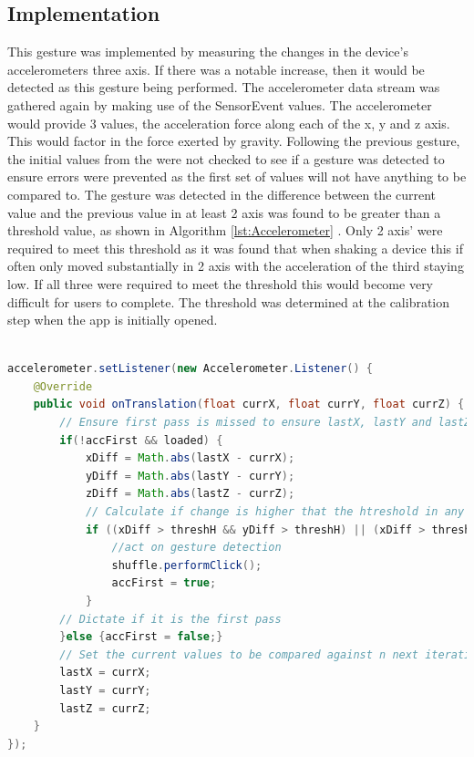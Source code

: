 \documentclass{l4proj}
\begin{document}
\subsection{Implementation}
This gesture was implemented by measuring the changes in the device's accelerometers three axis. If there was a notable increase, then it would be detected as this gesture being performed. The accelerometer data stream was gathered again by making use of the SensorEvent values. The accelerometer would provide 3 values, the acceleration force along each of the x, y and z axis. This would factor in the force exerted by gravity. Following the previous gesture, the initial values from the were not checked to see if a gesture was detected to ensure errors were prevented as the first set of values will not have anything to be compared to. The gesture was detected in the difference between the current value and the previous value in at least 2 axis was found to be greater than a threshold value, as shown in Algorithm \ref{lst:Accelerometer} . Only 2 axis’ were required to meet this threshold as it was found that when shaking a device this if often only moved substantially in 2 axis with the acceleration of the third staying low. If all three were required to meet the threshold this would become very difficult for users to complete. The threshold was determined at the calibration step when the app is initially opened.

\begin{lstlisting}[language=java, float, caption={Java code detailing how the Shake Gesture is detected and how it is acted upon, this particular instance for when detection is made on the Tunes Activity.}, label=lst:Accelerometer]

accelerometer.setListener(new Accelerometer.Listener() {
    @Override
    public void onTranslation(float currX, float currY, float currZ) {
        // Ensure first pass is missed to ensure lastX, lastY and lastZ have values adn songs are available
        if(!accFirst && loaded) {
            xDiff = Math.abs(lastX - currX);
            yDiff = Math.abs(lastY - currY);
            zDiff = Math.abs(lastZ - currZ);
            // Calculate if change is higher that the htreshold in any two axis
            if ((xDiff > threshH && yDiff > threshH) || (xDiff > threshH && zDiff > threshH) || (yDiff > threshH && zDiff > threshH)){
                //act on gesture detection
                shuffle.performClick();
                accFirst = true;
            }
        // Dictate if it is the first pass
        }else {accFirst = false;}
        // Set the current values to be compared against n next iteration
        lastX = currX;
        lastY = currY;
        lastZ = currZ;
    }        
});
\end{lstlisting}
\end{document}
